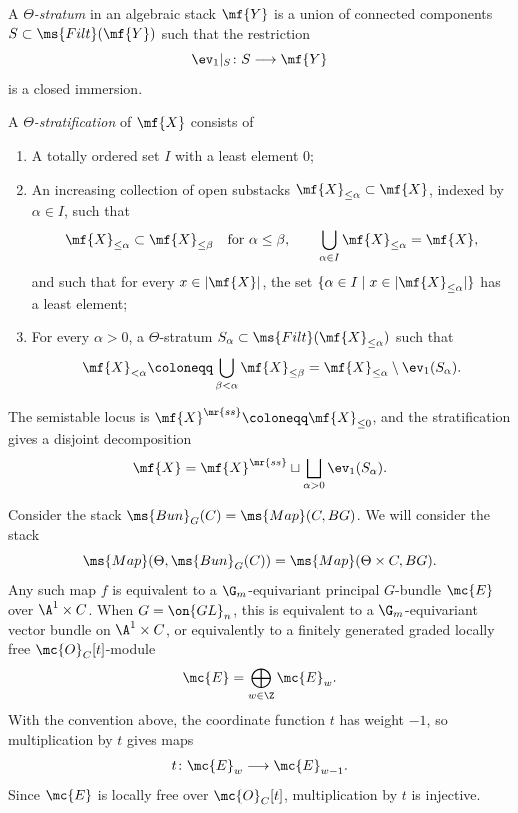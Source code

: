 \begin{defn}
    A \textit{\(\Theta\)-stratum} in an algebraic stack \(\mf{Y}\) is a union of connected components \(S\subset\ms{Filt}(\mf{Y})\) such that the restriction
    \[
        \ev_1|_S\colon S\longrightarrow\mf{Y}
    \]
    is a closed immersion.

    A \textit{\(\Theta\)-stratification} of \(\mf{X}\) consists of
    \begin{enumerate}
        \item A totally ordered set \(I\) with a least element \(0\);
        \item An increasing collection of open substacks \(\mf{X}_{\leq\alpha}\subset\mf{X}\), indexed by \(\alpha\in I\), such that
        \[
            \mf{X}_{\leq\alpha}\subset\mf{X}_{\leq\beta}
            \quad\text{for }\alpha\leq\beta,
            \qquad
            \bigcup_{\alpha\in I}\mf{X}_{\leq\alpha}=\mf{X},
        \]
        and such that for every \(x\in|\mf{X}|\), the set \(\{\alpha\in I\mid x\in|\mf{X}_{\leq\alpha}|\}\) has a least element;
        \item For every \(\alpha>0\), a \(\Theta\)-stratum \(S_\alpha\subset\ms{Filt}(\mf{X}_{\leq\alpha})\) such that
        \[
            \mf{X}_{<\alpha}
            \coloneqq
            \bigcup_{\beta<\alpha}\mf{X}_{\leq\beta}
            =
            \mf{X}_{\leq\alpha}\setminus\ev_1(S_\alpha).
        \]
    \end{enumerate}
    The semistable locus is \(\mf{X}^{\mr{ss}}\coloneqq\mf{X}_{\leq0}\), and the stratification gives a disjoint decomposition
    \[
        \mf{X}
        =
        \mf{X}^{\mr{ss}}
        \sqcup
        \bigsqcup_{\alpha>0}\ev_1(S_\alpha).
    \]
\end{defn}

Consider the stack \(\ms{Bun}_G(C) = \ms{Map}(C, BG)\). We will consider the stack
\[ \ms{Map}(\Theta, \ms{Bun}_G(C)) = \ms{Map}(\Theta \times C, BG). \]
Any such map \(f\) is equivalent to a \(\G_m\)-equivariant principal \(G\)-bundle \(\mc{E}\) over \(\A^1\times C\). When \(G=\on{GL}_n\), this is equivalent to a \(\G_m\)-equivariant vector bundle on \(\A^1\times C\), or equivalently to a finitely generated graded locally free \(\mc{O}_C[t]\)-module
\[
    \mc{E}=\bigoplus_{w\in\Z}\mc{E}_w.
\]
With the convention above, the coordinate function \(t\) has weight \(-1\), so multiplication by \(t\) gives maps
\[
    t\colon\mc{E}_w\longrightarrow\mc{E}_{w-1}.
\]
Since \(\mc{E}\) is locally free over \(\mc{O}_C[t]\), multiplication by \(t\) is injective.

